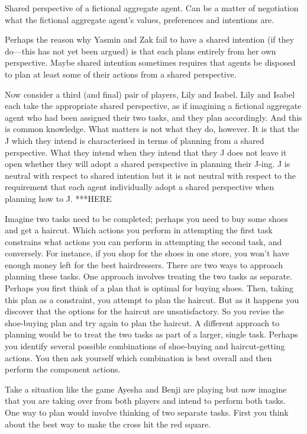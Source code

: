 \documentclass[12pt,\papersize]{extarticle}
\begin{document}
Shared perspective of a fictional aggregate agent.
Can be a matter of negotiation what the fictional aggregate agent's values, preferences and intentions are.

Perhaps the reason why Yasmin and Zak fail to have a shared intention (if they do---this has not yet been argued) is that each plans entirely from her own perspective. 
Maybe shared intention sometimes requires that agents be disposed to plan at least some of their actions from a shared perspective.

Now consider a third (and final) pair of players, Lily and Isabel.
Lily and Isabel each take the appropriate shared perspective, as if imagining a fictional aggregate agent who had been assigned their two tasks, 
and they plan accordingly.
And this is common knowledge.
What matters is not what they do, however.
It is that the J which they intend is characterised in terms of planning from a shared perspective.
What they intend when they intend that they J does not leave it open whether they will adopt a shared perspective in planning their J-ing.
J is neutral with respect to shared intention but it is not neutral with respect to the requirement that each agent individually adopt a shared perspective when planning how to J.
***HERE



Imagine two tasks need to be completed; perhaps you need to buy some shoes and get a haircut. 
Which actions you perform in attempting the first task constrains what actions you can perform in attempting the second task, and conversely.
For instance, if you shop for the shoes in one store, you won't have enough money left for the best hairdressers.
There are two ways to approach planning these tasks.
One approach involves treating the two tasks as separate.
Perhaps you first think of a plan that is optimal for buying shoes.
Then, taking this plan as a constraint, you attempt to plan the haircut.
But as it happens you discover that the options for the haircut are unsatisfactory.
So you revise the shoe-buying plan and try again to plan the haircut.
A different approach to planning would be to treat the two tasks as part of a larger, single task.
Perhaps you identify several possible combinations of shoe-buying and haircut-getting actions.
You then ask yourself which combination is best overall and then perform the component actions.




Take a situation like the game Ayesha and Benji are playing but now imagine that you are taking over from both players and intend to perform both tasks. 
One way to plan would involve thinking of two separate tasks.
First you think about the best way to make the cross hit the red square.
\end{document}
